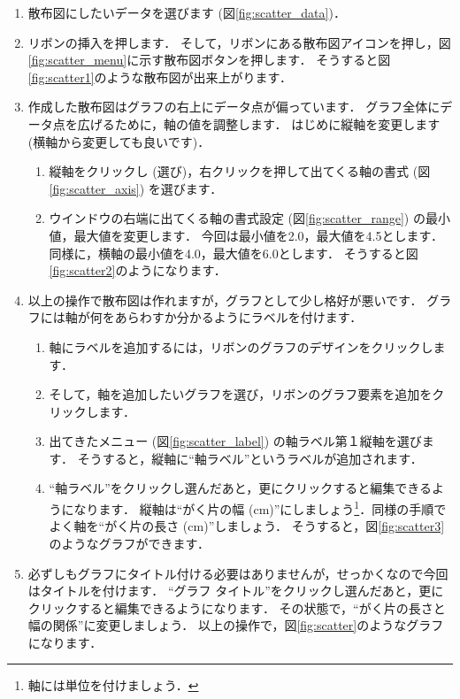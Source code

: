 \begin{enumerate}
    \item 散布図にしたいデータを選びます (図\ref{fig:scatter_data})．
    \item リボンの挿入を押します．
    そして，リボンにある散布図アイコンを押し，図\ref{fig:scatter_menu}に示す散布図ボタンを押します．
    そうすると図\ref{fig:scatter1}のような散布図が出来上がります．
    \item 作成した散布図はグラフの右上にデータ点が偏っています．
    グラフ全体にデータ点を広げるために，軸の値を調整します．
    はじめに縦軸を変更します (横軸から変更しても良いです)．
    \begin{enumerate}
        \item 縦軸をクリックし (選び)，右クリックを押して出てくる軸の書式 (図\ref{fig:scatter_axis}) を選びます．
        \item ウインドウの右端に出てくる軸の書式設定 (図\ref{fig:scatter_range}) の最小値，最大値を変更します．
        今回は最小値を2.0，最大値を4.5とします．
        同様に，横軸の最小値を4.0，最大値を6.0とします．
        そうすると図\ref{fig:scatter2}のようになります．
    \end{enumerate}
    \item 以上の操作で散布図は作れますが，グラフとして少し格好が悪いです．
    グラフには軸が何をあらわすか分かるようにラベルを付けます．
    \begin{enumerate}
        \item 軸にラベルを追加するには，リボンのグラフのデザインをクリックします．
        \item そして，軸を追加したいグラフを選び，リボンのグラフ要素を追加をクリックします．
        \item 出てきたメニュー (図\ref{fig:scatter_label}) の軸ラベル第１縦軸を選びます．
        そうすると，縦軸に``軸ラベル''というラベルが追加されます．
        \item ``軸ラベル''をクリックし選んだあと，更にクリックすると編集できるようになります．
        縦軸は``がく片の幅 (cm)''にしましょう\footnote{軸には単位を付けましょう．}．同様の手順でよく軸を``がく片の長さ (cm)''しましょう．
        そうすると，図\ref{fig:scatter3}のようなグラフができます．
    \end{enumerate}
    \item 必ずしもグラフにタイトル付ける必要はありませんが，せっかくなので今回はタイトルを付けます．
    ``グラフ タイトル''をクリックし選んだあと，更にクリックすると編集できるようになります．
    その状態で，``がく片の長さと幅の関係''に変更しましょう．
    以上の操作で，図\ref{fig:scatter}のようなグラフになります．
\end{enumerate}


